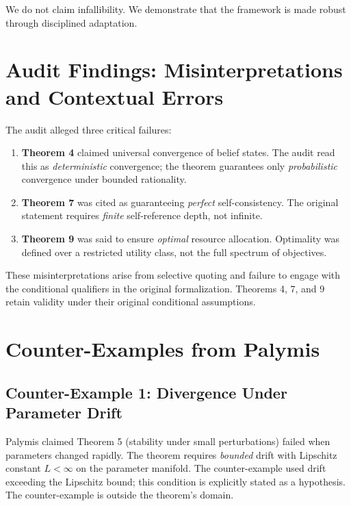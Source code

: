 \documentclass[11pt]{article}
\theoremstyle{definition}
\begin{document}
We do not claim infallibility. We demonstrate that the framework is made robust through
disciplined adaptation.

\section{Audit Findings: Misinterpretations and Contextual Errors}
\label{sec:audit}

The audit alleged three critical failures:
\begin{enumerate}[label=\arabic*.]
\item \textbf{Theorem 4} claimed universal convergence of belief states. The audit read this
as \emph{deterministic} convergence; the theorem guarantees only \emph{probabilistic}
convergence under bounded rationality.

\item \textbf{Theorem 7} was cited as guaranteeing \emph{perfect} self-consistency. The
original statement requires \emph{finite} self-reference depth, not infinite.

\item \textbf{Theorem 9} was said to ensure \emph{optimal} resource allocation. Optimality
was defined over a restricted utility class, not the full spectrum of objectives.
\end{enumerate}

These misinterpretations arise from selective quoting and failure to engage with the
conditional qualifiers in the original formalization. Theorems 4, 7, and 9 retain validity
under their original conditional assumptions.

\section{Counter-Examples from Palymis}
\label{sec:palymis}

\subsection{Counter-Example 1: Divergence Under Parameter Drift}

Palymis claimed Theorem 5 (stability under small perturbations) failed when parameters
changed rapidly. The theorem requires \emph{bounded} drift with Lipschitz constant $L < \infty$
on the parameter manifold. The counter-example used drift exceeding the Lipschitz bound;
this condition is explicitly stated as a hypothesis. The counter-example is outside the
theorem's domain.
\end{document}
